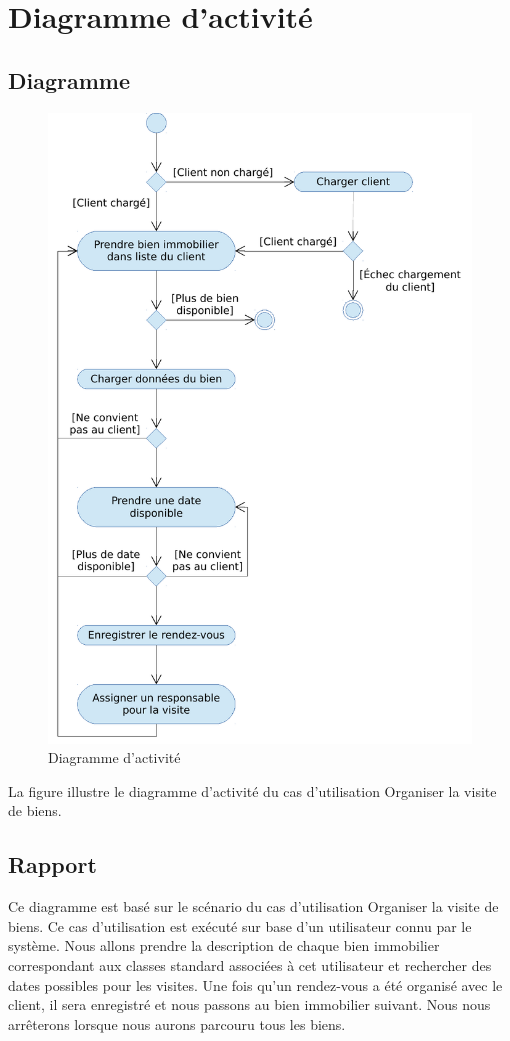 \chapter{Diagramme d'activité}

\section{Diagramme}

\begin{figure}
  \centering
  \includegraphics[scale=0.67]{IMG/ad}
  \caption{Diagramme d'activité}
  \label{img_ad}
\end{figure}

La figure  illustre le diagramme d'activité du cas d'utilisation \og{}Organiser la visite de biens\fg{}.

\section{Rapport}

Ce diagramme est basé sur le scénario du cas d'utilisation \og{}Organiser la visite de biens\fg{}. Ce cas d'utilisation est exécuté sur base d'un utilisateur connu par le système. Nous allons prendre la description de chaque bien immobilier correspondant aux classes standard associées à cet utilisateur et rechercher des dates possibles pour les visites. Une fois qu'un rendez-vous a été organisé avec le client, il sera enregistré et nous passons au bien immobilier suivant. Nous nous arrêterons lorsque nous aurons parcouru tous les biens.